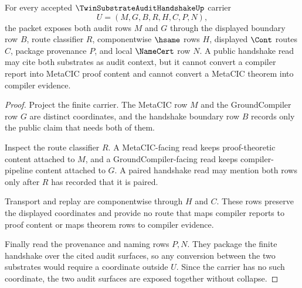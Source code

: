 \begin{theorem}
\label{thm:twin-substrate-audit-handshake-separation}
For every accepted $\TwinSubstrateAuditHandshakeUp$ carrier
$$
U=(M,G,B,R,H,C,P,N),
$$
the packet exposes both audit rows $M$ and $G$ through the displayed boundary row $B$, route classifier $R$, componentwise $\hsame$ rows $H$, displayed $\Cont$ routes $C$, package provenance $P$, and local $\NameCert$ row $N$. A public handshake read may cite both substrates as audit context, but it cannot convert a compiler report into MetaCIC proof content and cannot convert a MetaCIC theorem into compiler evidence.
\end{theorem}
\begin{proof}
Project the finite carrier. The MetaCIC row $M$ and the GroundCompiler row $G$ are distinct coordinates, and the handshake boundary row $B$ records only the public claim that needs both of them.

Inspect the route classifier $R$. A MetaCIC-facing read keeps proof-theoretic content attached to $M$, and a GroundCompiler-facing read keeps compiler-pipeline content attached to $G$. A paired handshake read may mention both rows only after $R$ has recorded that it is paired.

Transport and replay are componentwise through $H$ and $C$. These rows preserve the displayed coordinates and provide no route that maps compiler reports to proof content or maps theorem rows to compiler evidence.

Finally read the provenance and naming rows $P,N$. They package the finite handshake over the cited audit surfaces, so any conversion between the two substrates would require a coordinate outside $U$. Since the carrier has no such coordinate, the two audit surfaces are exposed together without collapse.
\end{proof}


\begin{closurestatus}{\TwinSubstrateAuditHandshakeUp}
  \theoryclosure{\seedClosure}
  \formalstatus{\unformalizedV}
\end{closurestatus}

